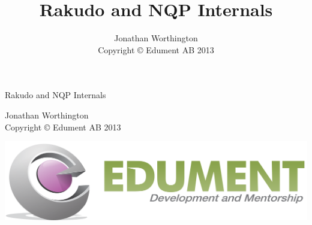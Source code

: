 \documentclass[a4paper]{book}
\title{Rakudo and NQP Internals}
\author{Jonathan Worthington \\
        Copyright \copyright{} Edument AB 2013
}
\begin{document}
\begin{titlepage}

\vspace*{\fill}

\begin{center}
\huge
Rakudo and NQP Internals

\vspace{3ex}

\large
Jonathan Worthington \\
Copyright \copyright{} Edument AB 2013

\vspace{3ex}

\includegraphics[scale=0.1]{images/edument-logo.png}
\end{center}

\vspace*{\fill}

\end{titlepage}



\end{document}
